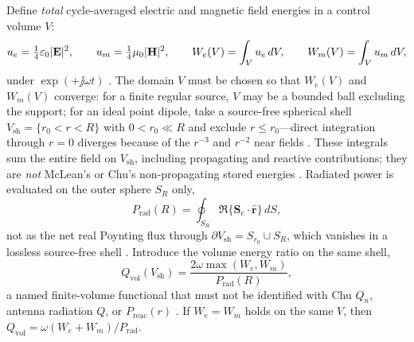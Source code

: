 Define \emph{total} cycle-averaged electric and magnetic field energies in a control volume $V$:
\[
u_e=\tfrac14\varepsilon_0|\mathbf{E}|^2,\qquad u_m=\tfrac14\mu_0|\mathbf{H}|^2,
\qquad
W_e(V)=\int_V u_e\,dV,\qquad W_m(V)=\int_V u_m\,dV,
\]
under $\exp(+\jj\omega t)$ \cite{stratton1941,harrington2001}. The domain $V$ must be chosen so that $W_e(V)$ and $W_m(V)$ converge: for a finite regular source, $V$ may be a bounded ball excluding the support; for an ideal point dipole, take a source-free spherical shell $V_{\mathrm{sh}}=\{r_0<r<R\}$ with $0<r_0\ll R$ and exclude $r\le r_0$---direct integration through $r=0$ diverges because of the $r^{-3}$ and $r^{-2}$ near fields \cite{stratton1941,yaghjian1980dyadic}. These integrals sum the entire field on $V_{\mathrm{sh}}$, including propagating and reactive contributions; they are \emph{not} McLean's or Chu's non-propagating stored energies \cite{chu1948,mcclean1996}. Radiated power is evaluated on the outer sphere $S_R$ only,
\begin{equation}
\label{eq:ch1.qvol-prad-outer}
P_{\mathrm{rad}}(R)=\oint_{S_R}\Re\{\mathbf{S}_\mathrm{c}\cdot\hat{\mathbf{r}}\}\,dS,
\end{equation}
not as the net real Poynting flux through $\partial V_{\mathrm{sh}}=S_{r_0}\cup S_R$, which vanishes in a lossless source-free shell \cite{poynting1884,stratton1941}. Introduce the volume energy ratio on the same shell,
\begin{equation}
\label{eq:ch1.chu-q-adopted}
Q_{\mathrm{vol}}(V_{\mathrm{sh}})=\frac{2\omega\max(W_e,W_m)}{P_{\mathrm{rad}}(R)},
\end{equation}
a named finite-volume functional that must not be identified with Chu $Q_n$, antenna radiation $Q$, or $P_{\mathrm{reac}}(r)$ \cite{chu1948,mcclean1996}. If $W_e=W_m$ holds on the same $V$, then $Q_{\mathrm{vol}}=\omega(W_e+W_m)/P_{\mathrm{rad}}$.

